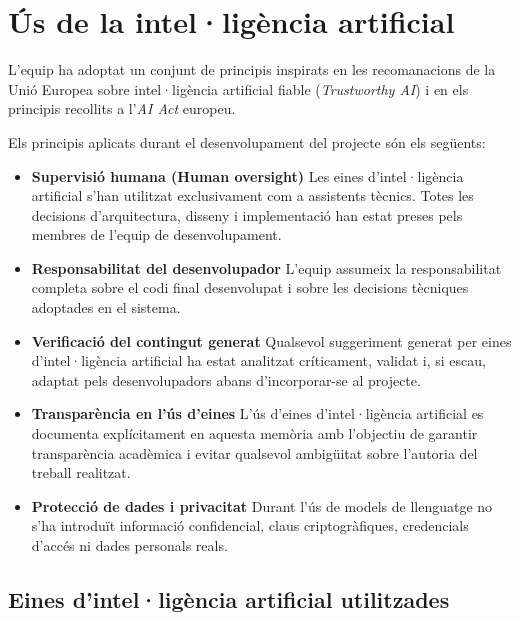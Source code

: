 
\chapter{Ús de la intel·ligència artificial}

L’equip ha adoptat un conjunt de principis inspirats en les recomanacions de la Unió Europea sobre intel·ligència artificial fiable (\textit{Trustworthy AI}) i en els principis recollits a l’\textit{AI Act} europeu.

Els principis aplicats durant el desenvolupament del projecte són els següents:

\begin{itemize}

\item \textbf{Supervisió humana (Human oversight)}  
Les eines d’intel·ligència artificial s’han utilitzat exclusivament com a assistents tècnics. Totes les decisions d’arquitectura, disseny i implementació han estat preses pels membres de l’equip de desenvolupament.

\item \textbf{Responsabilitat del desenvolupador}  
L’equip assumeix la responsabilitat completa sobre el codi final desenvolupat i sobre les decisions tècniques adoptades en el sistema.

\item \textbf{Verificació del contingut generat}  
Qualsevol suggeriment generat per eines d’intel·ligència artificial ha estat analitzat críticament, validat i, si escau, adaptat pels desenvolupadors abans d’incorporar-se al projecte.

\item \textbf{Transparència en l’ús d’eines}  
L’ús d’eines d’intel·ligència artificial es documenta explícitament en aquesta memòria amb l’objectiu de garantir transparència acadèmica i evitar qualsevol ambigüitat sobre l’autoria del treball realitzat.

\item \textbf{Protecció de dades i privacitat}  
Durant l’ús de models de llenguatge no s’ha introduït informació confidencial, claus criptogràfiques, credencials d’accés ni dades personals reals.

\end{itemize}

\section{Eines d’intel·ligència artificial utilitzades}

